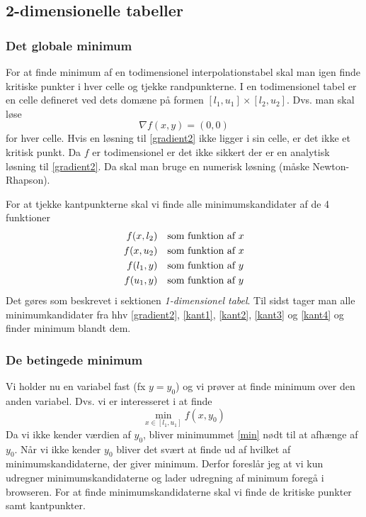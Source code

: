 \documentclass[a4paper, 12pt]{memoir}
\begin{document}
\subsection{2-dimensionelle tabeller}
\subsubsection{Det globale minimum}
For at finde minimum af en todimensionel interpolationstabel skal man igen finde kritiske punkter i hver celle og tjekke randpunkterne. I en todimensionel tabel er en celle defineret ved dets domæne på formen $[l_1,u_1]\times [l_2,u_2]$. Dvs. man skal løse 
\begin{equation}
\nabla f(x,y)=(0,0) \label{gradient2}
\end{equation}
for hver celle. Hvis en løsning til \eqref{gradient2} ikke ligger i sin celle, er det ikke et kritisk punkt. Da $f$ er todimensionel er det ikke sikkert der er en analytisk løsning til \eqref{gradient2}. Da skal man bruge en numerisk løsning (måske Newton-Rhapson). 

For at tjekke kantpunkterne skal vi finde alle minimumskandidater af de 4 funktioner 
\begin{align}
f(x,l_2) &\quad \textup{som funktion af } x\label{kant1}\\
f(x,u_2) &\quad \textup{som funktion af } x\label{kant2}\\
f(l_1,y) &\quad \textup{som funktion af } y\label{kant3}\\
f(u_1,y) &\quad \textup{som funktion af } y\label{kant4}
\end{align}
Det gøres som beskrevet i sektionen \emph{1-dimensionel tabel}. Til sidst tager man alle minimumkandidater fra hhv \eqref{gradient2}, \eqref{kant1}, \eqref{kant2}, \eqref{kant3} og \eqref{kant4} og finder minimum blandt dem. 
\subsubsection{De betingede minimum}
Vi holder nu en variabel fast (fx $y=y_0$) og vi prøver at finde minimum over den anden variabel. Dvs. vi er interesseret i at finde
\begin{equation}
\min_{x\in [l_1, u_1]} f(x,y_0) \label{min}
\end{equation}
Da vi ikke kender værdien af $y_0$, bliver minimummet \eqref{min} nødt til at afhænge af $y_0$. Når vi ikke kender $y_0$ bliver det svært at finde ud af hvilket af minimumskandidaterne, der giver minimum. Derfor foreslår jeg at vi kun udregner minimumskandidaterne og lader udregning af minimum foregå i browseren. For at finde minimumskandidaterne skal vi finde de kritiske punkter samt kantpunkter.
\end{document}
